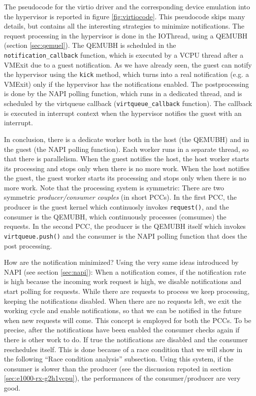 The pseudocode for the virtio driver and the corresponding device emulation into the hypervisor is reported in figure
\ref{fig:virtiocode}. This pseudocode skips many details, but contains all the interesting strategies to minimize notifications.
The request processing in the hypervisor is done in the IOThread, using a QEMUBH (section \ref{sec:qemuel}). The QEMUBH is scheduled
in the \texttt{notification\_callback} function, which is executed by a VCPU thread after a VMExit due to a guest notification.
As we have already seen, the guest can notify the hypervisor using the \texttt{kick} method, which turns into a real notification
(e.g. a VMExit) only if the hypervisor has the notifications enabled.
The postprocessing is done by the NAPI polling function, which runs in a dedicated thread, and is scheduled by the virtqueue callback
(\texttt{virtqueue\_callback} function). The callback is executed in interrupt context when the hypervisor notifies the guest with
an interrupt.

\vspace{0.5cm}

In conclusion, there is a dedicate worker both in the host (the QEMUBH) and in the guest (the NAPI polling function). Each worker runs
in a separate thread, so that there is parallelism. When the guest notifies the host, the host worker starts its processing and stops
only when there is no more work. When the host notifies the guest, the guest worker starts its processing and stops only when there is
no more work. Note that the processing system is symmetric: There are two symmetric \emph{producer/consumer couples} (in short PCCs). In 
the first PCC, the producer is the guest kernel which continuosly invokes \texttt{request()}, and the consumer is the QEMUBH, which 
continuously processes (comsumes) the requests. In the second PCC, the producer is the QEMUBH itself which invokes 
\texttt{virtqueue.push()} and the consumer is the NAPI polling function that does the post processing.

\vspace{0.5cm}

How are the notification minimized? Using the very same ideas introduced by NAPI (see section \ref{sec:napi}): When a notification comes,
if the notification rate is high because the incoming work request is high, we disable notifications and start polling for
requests. While there are requests to process we keep processing, keeping the notifications disabled. When there are no requests left, we
exit the working cycle and enable notifications, so that we can be notified in the future when new requests will come.
This concept is employed for both the PCCs. To be precise, after the notifications have been enabled the consumer 
checks again if there is other work to do. If true the notifications are disabled and the consumer reschedules itself. This is done because
of a race condition that we will show in the following ``Race condition analysis'' subsection.
Using this system, if the consumer is slower than the producer (see the discussion repoted in section \ref{sec:e1000-rx-g2h1vcpu}), the 
performances of the consumer/producer are very good.

